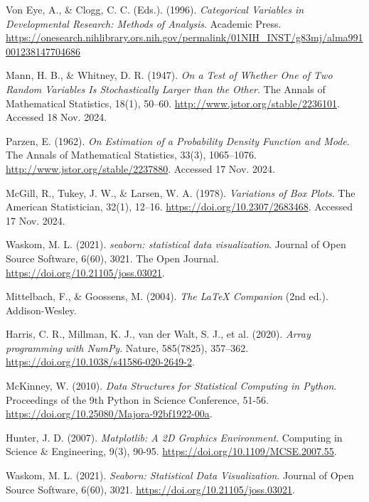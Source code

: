 \documentclass[a4paper, 12pt]{article}
\begin{document}
\begin{thebibliography}{15}
Von Eye, A., \& Clogg, C. C. (Eds.). (1996). 
\textit{Categorical Variables in Developmental Research: Methods of Analysis}. 
Academic Press. 
\url{https://onesearch.nihlibrary.ors.nih.gov/permalink/01NIH_INST/g83mj/alma991001238147704686}

Mann, H. B., \& Whitney, D. R. (1947).
\textit{On a Test of Whether One of Two Random Variables Is Stochastically Larger than the Other}.
The Annals of Mathematical Statistics, 18(1), 50--60.
\url{http://www.jstor.org/stable/2236101}. Accessed 18 Nov. 2024.


Parzen, E. (1962). 
\textit{On Estimation of a Probability Density Function and Mode}. 
The Annals of Mathematical Statistics, 33(3), 1065--1076. 
\url{http://www.jstor.org/stable/2237880}. Accessed 17 Nov. 2024.

McGill, R., Tukey, J. W., \& Larsen, W. A. (1978). 
\textit{Variations of Box Plots}. 
The American Statistician, 32(1), 12--16. 
\url{https://doi.org/10.2307/2683468}. Accessed 17 Nov. 2024.

Waskom, M. L. (2021). 
\textit{seaborn: statistical data visualization}. 
Journal of Open Source Software, 6(60), 3021. 
The Open Journal. 
\url{https://doi.org/10.21105/joss.03021}.

Mittelbach, F., \& Goossens, M. (2004).
\textit{The LaTeX Companion} (2nd ed.).
Addison-Wesley.

Harris, C. R., Millman, K. J., van der Walt, S. J., et al. (2020).
\textit{Array programming with NumPy}.
Nature, 585(7825), 357–362.
\href{https://doi.org/10.1038/s41586-020-2649-2}{https://doi.org/10.1038/s41586-020-2649-2}.

McKinney, W. (2010).
\textit{Data Structures for Statistical Computing in Python}.
Proceedings of the 9th Python in Science Conference, 51-56.
\href{https://doi.org/10.25080/Majora-92bf1922-00a}{https://doi.org/10.25080/Majora-92bf1922-00a}.

Hunter, J. D. (2007).
\textit{Matplotlib: A 2D Graphics Environment}.
Computing in Science \& Engineering, 9(3), 90-95.
\href{https://doi.org/10.1109/MCSE.2007.55}{https://doi.org/10.1109/MCSE.2007.55}.

Waskom, M. L. (2021).
\textit{Seaborn: Statistical Data Visualization}.
Journal of Open Source Software, 6(60), 3021.
\href{https://doi.org/10.21105/joss.03021}{https://doi.org/10.21105/joss.03021}.


\end{thebibliography}
\end{document}
